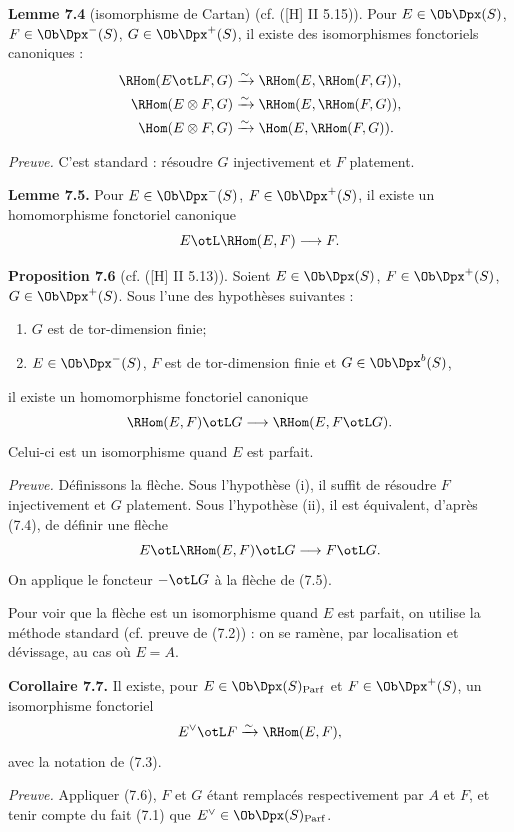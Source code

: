 \documentclass[11pt]{article}
\newcommand{\Parf}{\operatorname{Parf}}
\begin{document}
\textbf{Lemme 7.4} (isomorphisme de Cartan) (cf. ([H] II 5.15)). Pour \(E\in\Ob\Dpx(S)\), \(F\in\Ob\Dpx^-(S)\), \(G\in\Ob\Dpx^+(S)\), il existe des isomorphismes fonctoriels canoniques :
\[
\begin{aligned}
\RHom(E\otL F,G)&\xrightarrow{\sim}\RHom(E,\RHom(F,G)),\\
\RHom(E\otimes F,G)&\xrightarrow{\sim}\RHom(E,\RHom(F,G)),\\
\Hom(E\otimes F,G)&\xrightarrow{\sim}\Hom(E,\RHom(F,G)).
\end{aligned}
\]

\emph{Preuve.} C'est standard : résoudre \(G\) injectivement et \(F\) platement.

\textbf{Lemme 7.5.} Pour \(E\in\Ob\Dpx^-(S)\), \(F\in\Ob\Dpx^+(S)\), il existe un homomorphisme fonctoriel canonique
\[
  E\otL\RHom(E,F)\longrightarrow F.
\]

\textbf{Proposition 7.6} (cf. ([H] II 5.13)). Soient \(E\in\Ob\Dpx(S)\), \(F\in\Ob\Dpx^+(S)\), \(G\in\Ob\Dpx^+(S)\). Sous l'une des hypothèses suivantes :
\begin{enumerate}[label=(\roman*)]
\item \(G\) est de tor-dimension finie;
\item \(E\in\Ob\Dpx^-(S)\), \(F\) est de tor-dimension finie et \(G\in\Ob\Dpx^b(S)\),
\end{enumerate}
il existe un homomorphisme fonctoriel canonique
\[
  \RHom(E,F)\otL G
  \longrightarrow
  \RHom(E,F\otL G).
\]
Celui-ci est un isomorphisme quand \(E\) est parfait.

\emph{Preuve.} Définissons la flèche. Sous l'hypothèse (i), il suffit de résoudre \(F\) injectivement et \(G\) platement. Sous l'hypothèse (ii), il est équivalent, d'après (7.4), de définir une flèche
\[
  E\otL\RHom(E,F)\otL G\longrightarrow F\otL G.
\]
On applique le foncteur \(-\otL G\) à la flèche de (7.5).

Pour voir que la flèche est un isomorphisme quand \(E\) est parfait, on utilise la méthode standard (cf. preuve de (7.2)) : on se ramène, par localisation et dévissage, au cas où \(E=A\).

\textbf{Corollaire 7.7.} Il existe, pour \(E\in\Ob\Dpx(S)_{\Parf}\) et \(F\in\Ob\Dpx^+(S)\), un isomorphisme fonctoriel
\[
  E^\vee\otL F\xrightarrow{\sim}\RHom(E,F),
\]
avec la notation de (7.3).

\emph{Preuve.} Appliquer (7.6), \(F\) et \(G\) étant remplacés respectivement par \(A\) et \(F\), et tenir compte du fait (7.1) que \(E^\vee\in\Ob\Dpx(S)_{\Parf}\).
\end{document}

